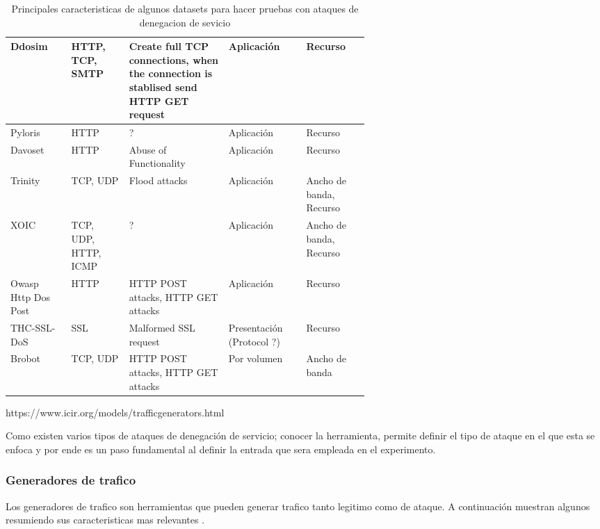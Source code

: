 \documentclass[12pt]{article}
\begin{document}
\begin{table}[htbp]
\begin{tabular}{|p{0.1\linewidth}|p{0.1\linewidth}|p{0.2\linewidth}|p{0.1\linewidth}|p{0.1\linewidth}|}
Ddosim &
HTTP, TCP, SMTP & 
Create full TCP connections, when the connection is stablised send HTTP GET request & 
Aplicación & 
Recurso
\tabularnewline \hline

Pyloris &
HTTP & 
? & 
Aplicación & 
Recurso
\tabularnewline \hline

Davoset &
HTTP & 
Abuse of Functionality & 
Aplicación & 
Recurso
\tabularnewline \hline

Trinity &
TCP, UDP & 
Flood attacks & 
Aplicación & 
Ancho de banda, Recurso
\tabularnewline \hline

XOIC &
TCP, UDP, HTTP,  ICMP & 
? & 
Aplicación & 
Ancho de banda, Recurso
\tabularnewline \hline

Owasp Http Dos Post &
HTTP & 
HTTP POST attacks, HTTP GET attacks & 
Aplicación & 
Recurso
\tabularnewline \hline

THC-SSL-DoS &
SSL & 
Malformed SSL request & 
Presentación (Protocol ?) & 
Recurso
\tabularnewline \hline

Brobot &
TCP, UDP & 
HTTP POST attacks, HTTP GET attacks &  
Por volumen & 
Ancho de banda
\tabularnewline \hline

\end{tabular}
\caption{Principales caracteristicas de algunos datasets para hacer pruebas con ataques de denegacion de sevicio} \label{tab:sometab}
\end{table} 




https://www.icir.org/models/trafficgenerators.html


Como existen varios tipos de ataques de denegación de servicio; conocer la herramienta, permite definir el tipo de ataque en el que esta se enfoca y por ende es un paso fundamental al definir la entrada que sera empleada en el experimento.

\subsubsection{Generadores de trafico}

Los generadores de trafico son herramientas que pueden generar trafico tanto legitimo como de ataque. A continuación muestran algunos resumiendo sus caracteristicas mas relevantes \citep{dos_tools}. 
\end{document}
